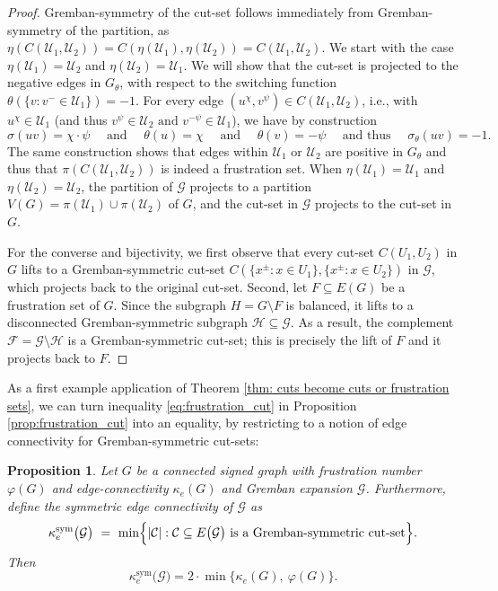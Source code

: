 \documentclass[reprint,onecolumn]{article}
\newtheorem{proposition}[theorem]{Proposition}
\newcommand{\mc}[1]{\mathcal{#1}}
\newcommand{\1}{\mathbb{1}}
\newcommand{\0}{\mathbf{0}}
\begin{document}
\begin{proof}
Gremban-symmetry of the cut-set follows immediately from Gremban-symmetry of the partition, as $\eta(C(\mathcal{U}_1,\mathcal{U}_2))=C(\eta(\mathcal{U}_1),\eta(\mathcal{U}_2))=C(\mathcal{U}_1,\mathcal{U}_2)$. We start with the case $\eta(\mathcal{U}_1)=\mathcal{U}_2$ and $\eta(\mathcal{U}_2)=\mathcal{U}_1$. We will show that the cut-set is projected to the negative edges in $G_\theta$, with respect to the switching function $\theta(\{v:v^-\in\mathcal{U}_1\})=-1$. For every edge $(u^\chi,v^{\psi})\in C(\mathcal{U}_1,\mathcal{U}_2)$, i.e., with $u^\chi\in \mathcal{U}_1$ (and thus $v^\psi\in\mc U_2\text{~and~}v^{-\psi}\in \mc U_1$), we have by construction
$$
\sigma(uv)=\chi\cdot\psi\quad\text{~and~}\quad\theta(u)=\chi\quad\text{~and~}\quad\theta(v)=-\psi \quad\text{~and thus~}\quad \sigma_\theta(uv)=-1.
$$
The same construction shows that edges within $\mathcal{U}_1$ or $\mathcal{U}_2$ are positive in $G_\theta$ and thus that $\pi(C(\mathcal{U}_1,\mathcal{U}_2))$ is indeed a frustration set. When $\eta(\mathcal{U}_1)=\mathcal{U}_1$ and $\eta(\mathcal{U}_2)=\mathcal{U}_2$, the partition of $\mathcal{G}$ projects to a partition $V(G)=\pi(\mathcal{U}_1)\cup\pi(\mathcal{U}_2)$ of $G$, and the cut-set in $\mathcal{G}$ projects to the cut-set in $G$.

For the converse and bijectivity, we first observe that every cut-set $C(U_1,U_2)$ in $G$ lifts to a Gremban-symmetric cut-set $C(\{x^\pm:x\in U_1\},\{x^\pm:x\in U_2\})$ in $\mathcal{G}$, which projects back to the original cut-set. Second, let $F\subseteq E(G)$ be a frustration set of $G$. Since the subgraph $H=G\setminus F$ is balanced, it lifts to a disconnected Gremban-symmetric subgraph $\mathcal{H}\subseteq \mathcal{G}$. As a result, the complement $\mathcal{F}=\mathcal{G}\setminus\mathcal{H}$ is a Gremban-symmetric cut-set; this is precisely the lift of $F$ and it projects back to $F$.
\end{proof}
As a first example application of Theorem \ref{thm: cuts become cuts or frustration sets}, we can turn inequality \eqref{eq:frustration_cut} in Proposition \ref{prop:frustration_cut} into an equality, by restricting to a notion of edge connectivity for Gremban-symmetric cut-sets:
\begin{proposition}\label{prop:frustration_cut_cymmetric}
    Let \(G\) be a connected signed graph with frustration number \(\varphi(G)\) and edge-connectivity \(\kappa_e(G)\) and Gremban expansion $\mathcal{G}$. Furthermore, define the symmetric edge connectivity of $\mathcal{G}$ as
    \[
    \kappa_e^{\mathrm{sym}}\bigl(\mc G\bigr)
    \ =\ 
    \min\Bigl\{\lvert \mathcal{C}\rvert : \mathcal{C}\subseteq E\bigl(\mc G\bigr)\text{ is a Gremban-symmetric cut-set}\Bigr\}.
    \]
    Then
    \[
    \kappa_e^{\mathrm{sym}}\bigl(\mc G\bigr)
    =2\cdot \min\bigl\{\kappa_e(G),\ \varphi(G)\bigr\}.
    \]
\end{proposition}
\end{document}
